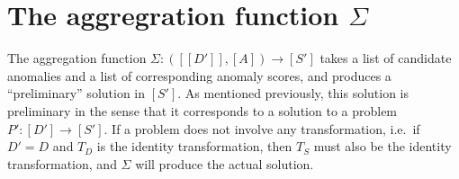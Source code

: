 %
%
%
%

\section{The aggregration function $\Sigma$}

The aggregation function $\Sigma: ([[D']], [A]) \rightarrow [S']$ takes a list of candidate anomalies and a list of corresponding anomaly scores, and produces a ``preliminary'' solution in $[S']$. As mentioned previously, this solution is preliminary in the sense that it corresponds to a solution to a problem $P': [D'] \rightarrow [S']$. If a problem does not involve any transformation, i.e.\ if  $D' = D$ and $T_D$ is the identity transformation, then $T_S$ must also be the identity transformation, and $\Sigma$ will produce the actual solution.

